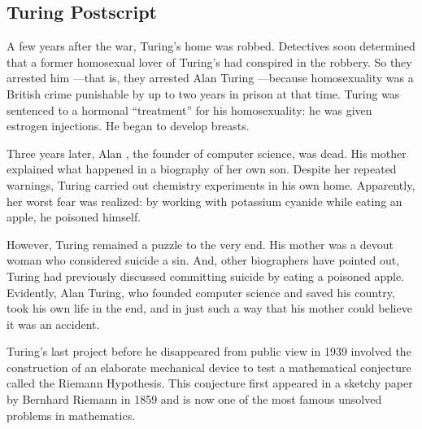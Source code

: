 
\subsection{Turing Postscript}

A few years after the war, Turing's home was robbed.  Detectives soon determined that a
former homosexual lover of Turing's had conspired in the robbery.  So they arrested him
---that is, they arrested Alan Turing ---because homosexuality was a British crime
punishable by up to two years in prison at that time.  Turing was sentenced to a hormonal
``treatment'' for his homosexuality: he was given estrogen injections.  He began to develop
breasts.

Three years later, Alan , the founder of computer science, was dead.  His
mother explained what happened in a biography of her own son.  Despite her repeated
warnings, Turing carried out chemistry experiments in his own home.  Apparently, her worst
fear was realized: by working with potassium cyanide while eating an apple, he poisoned
himself.

However, Turing remained a puzzle to the very end.  His mother was a
devout woman who considered suicide a sin.  And, other biographers
have pointed out, Turing had previously discussed committing suicide
by eating a poisoned apple.  Evidently, Alan Turing, who founded
computer science and saved his country, took his own life in the end,
and in just such a way that his mother could believe it was an
accident.

Turing's last project before he disappeared from public view in 1939 involved the
construction of an elaborate mechanical device to test a mathematical conjecture called the
Riemann Hypothesis.  This conjecture first appeared in a sketchy paper by Bernhard Riemann
in 1859 and is now one of the most famous unsolved problems in mathematics.

